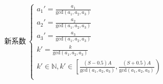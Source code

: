 \documentclass[preview]{standalone}
\begin{document}
\begin{align*}
\text{新系数}~\begin{cases}a_1' = \frac{a_1}{\mathrm{gcd}(a_1, a_2, a_3)} \\a_2' = \frac{a_2}{\mathrm{gcd}(a_1, a_2, a_3)} \\a_3' = \frac{a_3}{\mathrm{gcd}(a_1, a_2, a_3)} \\k' = \frac{k}{\mathrm{gcd}(a_1, a_2, a_3)} \\k' \in \mathbb{N}, k' \in \left[ \frac{(S - 0.5)A}{\mathrm{gcd}(a_1, a_2, a_3)}, \frac{(S + 0.5)A}{\mathrm{gcd}(a_1, a_2, a_3)} \right) \\\end{cases}
\end{align*}
\end{document}
